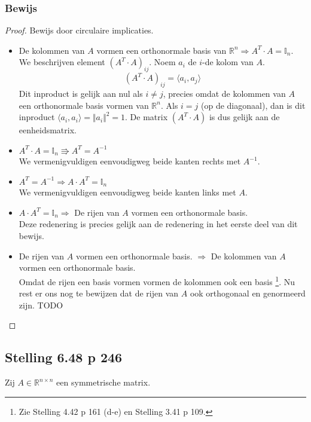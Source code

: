 \documentclass[lineaire_algebra_oplossingen.tex]{subfiles}
\begin{document}
\subsubsection*{Bewijs}
\begin{proof}
Bewijs door circulaire implicaties.
\begin{itemize}
\item
De kolommen van $A$ vormen een orthonormale basis van $\mathbb{R}^n \Rightarrow A^T \cdot A = \mathbb{I}_n$.\\
We beschrijven element $(A^T \cdot A)_{ij}$. Noem $a_i$ de $i$-de kolom van $A$.
\[
(A^T \cdot A)_{ij} = \langle a_i , a_j\rangle
\]
Dit inproduct is gelijk aan nul als $i\neq j$, precies omdat de kolommen van $A$ een orthonormale basis vormen van $\mathbb{R}^n$.
Als $i =j$ (op de diagonaal), dan is dit inproduct $\langle a_i , a_i \rangle = \Vert a_i\Vert^2 = 1$. De matrix $(A^T \cdot A)$ is dus gelijk aan de eenheidsmatrix.

\item
$A^T \cdot A = \mathbb{I}_n \Rrightarrow A^T =A^{-1}$\\
We vermenigvuldigen eenvoudigweg beide kanten rechts met $A^{-1}$.

\item
$A^T =A^{-1} \Rightarrow A \cdot A^T = \mathbb{I}_n$\\
We vermenigvuldigen eenvoudigweg beide kanten links met $A$.

\item
$A \cdot A^T = \mathbb{I}_n \Rightarrow $ De rijen van $A$ vormen een orthonormale basis.\\
Deze redenering is precies gelijk aan de redenering in het eerste deel van dit bewijs.

\item
De rijen van $A$ vormen een orthonormale basis. $\Rightarrow$ De kolommen van $A$ vormen een orthonormale basis.\\
Omdat de rijen een basis vormen vormen de kolommen ook een basis \footnote{Zie Stelling 4.42 p 161 (d-e) en Stelling 3.41 p 109.}. Nu rest er ons nog te bewijzen dat de rijen van $A$ ook orthogonaal en genormeerd zijn.
TODO

\end{itemize}
\end{proof}

\subsection{Stelling 6.48 p 246}
Zij $A\in \mathbb{R}^{n\times n}$ een symmetrische matrix.
\end{document}
